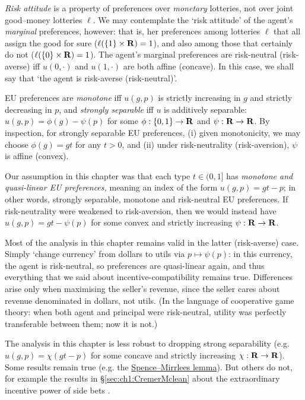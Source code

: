 \emph{Risk attitude} is a property of preferences over \emph{monetary} lotteries, not over joint good--money lotteries $\ell$.
We may contemplate the `risk attitude' of the agent's \emph{marginal} preferences, however:
that is, her preferences among lotteries $\ell$ that all assign the good for sure ($\ell( \{1\} \times \mathbf{R} ) = 1$),
and also among those that certainly do not ($\ell( \{0\} \times \mathbf{R} ) = 1$).
The agent's marginal preferences are risk-neutral (risk-averse)
iff $u(0,\cdot)$ and $u(1,\cdot)$ are both affine (concave).
In this case, we shall say that `the agent is risk-averse (risk-neutral)'.

EU preferences are \emph{monotone} iff $u(g,p)$ is strictly increasing in $g$ and strictly decreasing in $p$,
and \emph{strongly separable} iff $u$ is additively separable:
$u(g,p) = \phi(g) - \psi(p)$
for some $\phi : \{0,1\} \to \mathbf{R}$ and $\psi : \mathbf{R} \to \mathbf{R}$.
By inspection, for strongly separable EU preferences,
(i) given monotonicity, we may choose $\phi(g) = gt$ for any $t>0$, and
(ii) under risk-neutrality (risk-aversion), $\psi$ is affine (convex).

Our assumption in this chapter
was that each type $t \in (0,1]$ has \emph{monotone and quasi-linear EU preferences,} meaning an index of the form $u(g,p) = gt - p$;
in other words, strongly separable, monotone and risk-neutral EU preferences.
If risk-neutrality were weakened to risk-aversion,
then we would instead have $u(g,p) = gt - \psi(p)$ for some convex and strictly increasing $\psi : \mathbf{R} \to \mathbf{R}$.

Most of the analysis in this chapter remains valid in the latter (risk-averse) case.
Simply `change currency' from dollars to utils via $p \mapsto \psi(p)$: in this currency, the agent is risk-neutral, so preferences are quasi-linear again,
and thus everything that we said about incentive-compatibility remains true.
Differences arise only when maximising the seller's revenue, since the seller cares about revenue denominated in dollars, not utils.
(In the language of cooperative game theory: when both agent and principal were risk-neutral, utility was perfectly transferable between them; now it is not.)

The analysis in this chapter is less robust to dropping strong separability (e.g. $u(g,p) = \chi( gt - p )$ for some concave and strictly increasing $\chi : \mathbf{R} \to \mathbf{R}$).
Some results remain true (e.g. the \hyperref[proposition:SM_lemma]{Spence--Mirrlees lemma}).
But others do not, for example the results in §\ref{sec:ch1:CremerMclean} about the extraordinary incentive power of side bets \parencite[see][]{Robert1991}.



